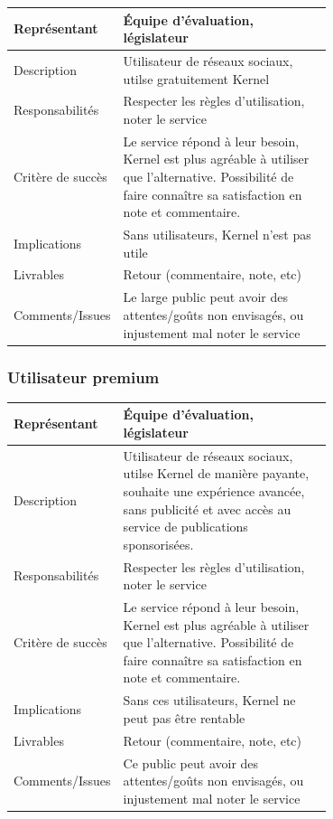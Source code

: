 \documentclass[11pt]{article}
\begin{document}
\begin{tabular}{|a|L{0.7\linewidth}|}
	\hline
	Représentant & Équipe d'évaluation, législateur \\
	\hline
	Description & Utilisateur de réseaux sociaux, utilse gratuitement Kernel \\
	\hline
	Responsabilités & Respecter les règles d'utilisation, noter le service \\
	\hline
	Critère de succès & Le service répond à leur besoin, Kernel est plus agréable à utiliser que l'alternative. Possibilité de faire connaître sa satisfaction en note et commentaire. \\
	\hline
	Implications & Sans utilisateurs, Kernel n'est pas utile \\
	\hline
	Livrables & Retour (commentaire, note, etc) \\
	\hline
	Comments/Issues & Le large public peut avoir des attentes/goûts non envisagés, ou injustement mal noter le service \\
	\hline
\end{tabular}

\subsubsection{Utilisateur premium}

\begin{tabular}{|a|L{0.7\linewidth}|}
\hline
Représentant & Équipe d'évaluation, législateur \\
\hline
Description & Utilisateur de réseaux sociaux, utilse Kernel  de manière payante, souhaite une expérience avancée, sans publicité et avec accès au service de publications sponsorisées. \\
\hline
Responsabilités & Respecter les règles d'utilisation, noter le service \\
\hline
Critère de succès & Le service répond à leur besoin, Kernel est plus agréable à utiliser que l'alternative. Possibilité de faire connaître sa satisfaction en note et commentaire. \\
\hline
Implications & Sans ces utilisateurs, Kernel ne peut pas être rentable \\
\hline
Livrables & Retour (commentaire, note, etc) \\
\hline
Comments/Issues & Ce public peut avoir des attentes/goûts non envisagés, ou injustement mal noter le service \\
\hline
\end{tabular}
\end{document}
